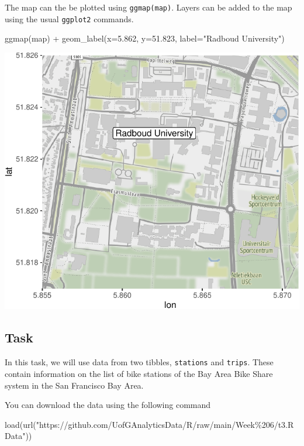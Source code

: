 \documentclass[
]{book}
\newenvironment{Shaded}{\begin{snugshade}}{\end{snugshade}}
\newcommand{\AttributeTok}[1]{\textcolor[rgb]{0.77,0.63,0.00}{#1}}
\newcommand{\FloatTok}[1]{\textcolor[rgb]{0.00,0.00,0.81}{#1}}
\newcommand{\FunctionTok}[1]{\textcolor[rgb]{0.00,0.00,0.00}{#1}}
\newcommand{\NormalTok}[1]{#1}
\newcommand{\SpecialCharTok}[1]{\textcolor[rgb]{0.00,0.00,0.00}{#1}}
\newcommand{\StringTok}[1]{\textcolor[rgb]{0.31,0.60,0.02}{#1}}
\begin{document}
The map can the be plotted using \texttt{ggmap(map)}. Layers can be added to the map using the usual \texttt{ggplot2} commands.

\begin{Shaded}
\begin{Highlighting}[]
\FunctionTok{ggmap}\NormalTok{(map) }\SpecialCharTok{+} 
    \FunctionTok{geom\_label}\NormalTok{(}\AttributeTok{x=}\FloatTok{5.862}\NormalTok{, }\AttributeTok{y=}\FloatTok{51.823}\NormalTok{, }\AttributeTok{label=}\StringTok{"Radboud University"}\NormalTok{) }
\end{Highlighting}
\end{Shaded}

\includegraphics{bookdown-demo_files/figure-latex/unnamed-chunk-85-1.pdf}

\hypertarget{task-8}{%
\subsection{Task}\label{task-8}}

In this task, we will use data from two tibbles, \texttt{stations} and \texttt{trips}. These contain information on the list of bike stations of the Bay Area Bike Share system in the San Francisco Bay Area.

You can download the data using the following command

\begin{Shaded}
\begin{Highlighting}[]
\FunctionTok{load}\NormalTok{(}\FunctionTok{url}\NormalTok{(}\StringTok{"https://github.com/UofGAnalyticsData/R/raw/main/Week\%206/t3.RData"}\NormalTok{))}
\end{Highlighting}
\end{Shaded}
\end{document}
